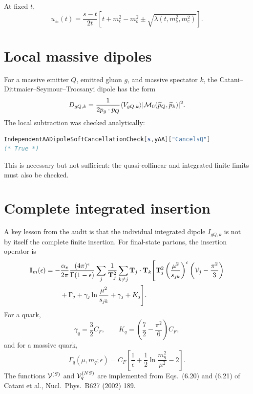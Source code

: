 \documentclass[11pt]{article}
\newcommand{\as}{\alpha_s}
\begin{document}
At fixed \(t\),
\begin{equation}
 u_\pm(t)=\frac{s-t}{2t}
 \left[t+m_c^2-m_b^2
 \pm\sqrt{\lambda(t,m_b^2,m_c^2)}\right].
\end{equation}

\section{Local massive dipoles}

For a massive emitter \(Q\), emitted gluon \(g\), and massive spectator \(k\),
the Catani--Dittmaier--Seymour--Trocsanyi dipole has the form
\begin{equation}
 D_{gQ,k}
 =\frac{1}{2p_g\cdot p_Q}
 \langle V_{gQ,k}\rangle |{\cal M}_0(\widetilde p_Q,\widetilde p_k)|^2 .
\end{equation}
The local subtraction was checked analytically:
\begin{lstlisting}[language=Mathematica]
IndependentAADipoleSoftCancellationCheck[s,yAA]["CancelsQ"]
(* True *)
\end{lstlisting}
This is necessary but not sufficient: the quasi-collinear and integrated
finite limits must also be checked.

\section{Complete integrated insertion}

A key lesson from the audit is that the individual integrated dipole
\(I_{gQ,k}\) is not by itself the complete finite insertion.  For final-state
partons, the insertion operator is
\begin{align}
 {\bf I}_m(\epsilon)
 =-&\frac{\as}{2\pi}\frac{(4\pi)^\epsilon}{\Gamma(1-\epsilon)}
 \sum_j\frac{1}{{\bf T}_j^2}\sum_{k\ne j}{\bf T}_j\cdot{\bf T}_k
 \Bigg[
 {\bf T}_j^2\left(\frac{\mu^2}{s_{jk}}\right)^\epsilon
 \left({\cal V}_j-\frac{\pi^2}{3}\right)\nonumber\\
 &+\Gamma_j+\gamma_j\ln\frac{\mu^2}{s_{jk}}
 +\gamma_j+K_j
 \Bigg].
\end{align}
For a quark,
\begin{equation}
 \gamma_q=\frac32C_F,\qquad
 K_q=\left(\frac72-\frac{\pi^2}{6}\right)C_F,
\end{equation}
and for a massive quark,
\begin{equation}
 \Gamma_q(\mu,m_q;\epsilon)
 =C_F\left[
 \frac1\epsilon+\frac12\ln\frac{m_q^2}{\mu^2}-2
 \right].
\end{equation}
The functions \({\cal V}^{(S)}\) and \({\cal V}_q^{(NS)}\) are implemented
from Eqs.\ (6.20) and (6.21) of
Catani et al., Nucl.\ Phys.\ B627 (2002) 189.
\end{document}
